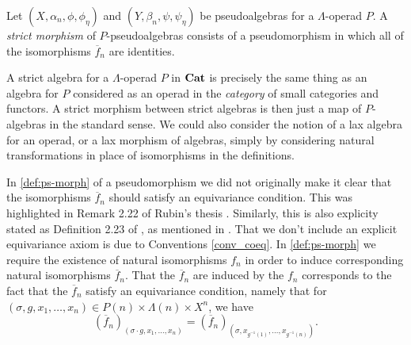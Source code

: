 \begin{Defi}
Let $(X, \alpha_n,\phi,\phi_\eta)$ and $(Y, \beta_n,\psi,\psi_{\eta})$ be pseudoalgebras for a $\Lambda$-operad $P$. A \textit{strict morphism} of $P$-pseudoalgebras consists of a pseudomorphism in which all of the isomorphisms $\overline{f}_{n}$ are identities.
\end{Defi}

\begin{rem}
A strict algebra for a $\Lambda$-operad $P$ in $\mathbf{Cat}$ is precisely the same thing as an algebra for $P$ considered as an operad in the \textit{category} of small categories and functors. A strict morphism between strict algebras is then just a map of $P$-algebras in the standard sense. We could also consider the notion of a lax algebra for an operad, or a lax morphism of algebras, simply by considering natural transformations in place of isomorphisms in the definitions.

In \cref{def:ps-morph} of a pseudomorphism we did not originally make it clear that the isomorphisms $\overline{f}_n$ should satisfy an equivariance condition. This was highlighted in Remark 2.22 of Rubin's thesis \cite{rubin-thesis}. Similarly, this is also explicity stated as Definition 2.23 of \cite{guillou_symmetric}, as mentioned in \cite{guillou_multiplicative}. That we don't include an explicit equivariance axiom is due to Conventions \ref{conv_coeq}. In \cref{def:ps-morph} we require the existence of natural isomorphisms $f_n$ in order to induce corresponding natural isomorphisms $\overline{f}_n$. That the $\overline{f}_n$ are induced by the $f_n$ corresponds to the fact that the $\overline{f}_n$ satisfy an equivariance condition, namely that for $(\sigma, g, x_1, \ldots, x_n) \in P(n) \times \Lambda(n) \times X^n$, we have
  \[
    \left(\overline{f}_n\right)_{\left(\sigma \cdot g, x_1, \ldots, x_n\right)} = \left(\overline{f}_n\right)_{\left(\sigma,x_{g^{-1}(1)},\ldots,x_{g^{-1}(n)}\right)}.
  \]
\end{rem}


